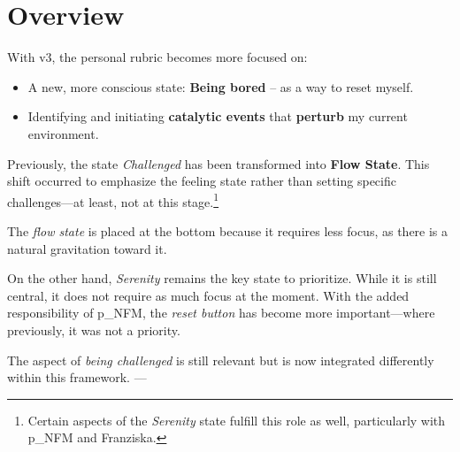 \section{Overview}   


With v3, the personal rubric becomes more focused on:  
\begin{itemize}  
	\item A new, more conscious state: \textbf{Being bored} – as a way to reset myself.  
	\item Identifying and initiating \textbf{catalytic events} that \textbf{perturb} my current environment.  
\end{itemize}  

Previously, the state \textit{Challenged} has been transformed into \textbf{Flow State}. This shift occurred to emphasize the feeling state rather than setting specific challenges—at least, not at this stage.\footnote{  
	Certain aspects of the \textit{Serenity} state fulfill this role as well, particularly with \gls{p_NFM} and Franziska.  
}  

The \textit{flow state} is placed at the bottom because it requires less focus, as there is a natural gravitation toward it.  

On the other hand, \textit{Serenity} remains the key state to prioritize. While it is still central, it does not require as much focus at the moment. With the added responsibility of \gls{p_NFM}, the \textit{reset button} has become more important—where previously, it was not a priority.  

The aspect of \textit{being challenged} is still relevant but is now integrated differently within this framework.  
---

